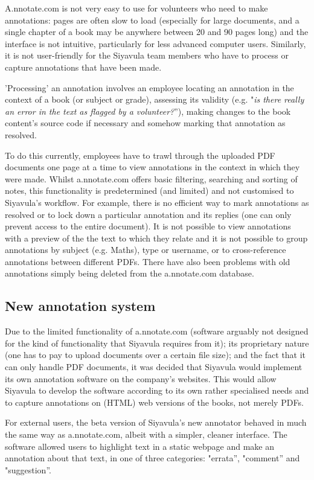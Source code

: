 A.nnotate.com is not very easy to use for volunteers who need to make annotations: pages are often slow to load (especially for large documents, and a single chapter of a book may be anywhere between 20 and 90 pages long) and the interface is not intuitive, particularly for less advanced computer users. Similarly, it is not user-friendly for the Siyavula team members who have to process or capture annotations that have been made. 

'Processing' an annotation involves an employee locating an annotation in the context of a book (or subject or grade), assessing its validity (e.g. "\textit{is there really an error in the text as flagged by a volunteer?}''), making changes to the book content's source code if necessary and somehow marking that annotation as resolved.

To do this currently, employees have to trawl through the uploaded PDF documents one page at a time to view annotations in the context in which they were made. Whilst a.nnotate.com offers basic filtering, searching and sorting of notes, this functionality is predetermined (and limited) and not customised to Siyavula's workflow. For example, there is no efficient way to mark annotations as resolved or to lock down a particular annotation and its replies (one can only prevent access to the entire document). It is not possible to view annotations with a preview of the the text to which they relate and it is not possible to group annotations by subject (e.g. Maths), type or username, or to cross-reference annotations between different PDFs. There have also been problems with old annotations simply being deleted from the a.nnotate.com database.  


\subsection{New annotation system}

Due to the limited functionality of a.nnotate.com (software arguably not designed for the kind of functionality that Siyavula requires from it); its proprietary nature (one has to pay to upload documents over a certain file size); and the fact that it can only handle PDF documents, it was decided that Siyavula would implement its own annotation software on the company's websites. This would allow Siyavula to develop the software according to its own rather specialised needs and to capture annotations on (HTML) web versions of the books, not merely PDFs.  

For external users, the beta version of Siyavula's new annotator behaved in much the same way as a.nnotate.com, albeit with a simpler, cleaner interface. The software allowed users to highlight text in a static webpage and make an annotation about that text, in one of three categories: "errata'', "comment'' and "suggestion''. 

